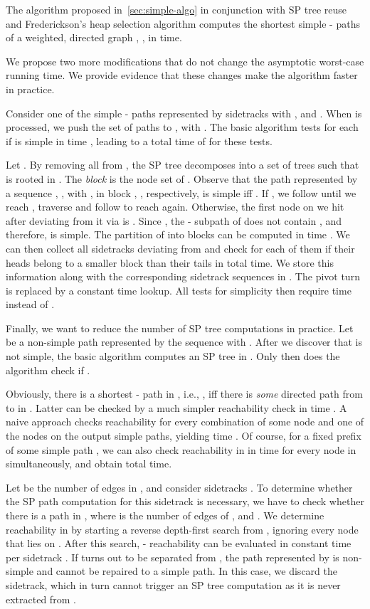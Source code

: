 \documentclass[runningheads,a4paper]{llncs}
\begin{document}
\begin{corollary}
    The algorithm proposed in~\autoref{sec:simple-algo} in conjunction with SP tree reuse and Frederickson's heap selection algorithm computes the  shortest simple - paths of a weighted, directed graph , , in  time.
\end{corollary}

We propose two more modifications that do not change the asymptotic worst-case running time.
We provide evidence that these changes make the algorithm faster in practice.

Consider one of the  simple - paths  represented by sidetracks  with ,  and .
When  is processed, we push the set  of paths to , with .
The basic algorithm tests for each  if  is simple in time , leading to a total time of  for these tests.

Let .
By removing all  from , the SP tree decomposes into a set of trees  such that  is rooted in .
The \emph{block } is the node set of .
Observe that the path  represented by a sequence , , with ,  in block , , respectively, is simple iff .
If , we follow  until we reach , traverse  and follow  to reach  again.
Otherwise, the first node on  we hit after deviating from it via  is .
Since , the - subpath of  does not contain , and therefore,  is simple.
The partition of  into blocks can be computed in time .
We can then collect all sidetracks deviating from  and check for each of them if their heads belong to a smaller block than their tails in  total time.
We store this information along with the corresponding sidetrack sequences in .
The pivot turn is replaced by a constant time lookup.
All tests for simplicity then require time  instead of .

Finally, we want to reduce the number of SP tree computations in practice.
Let  be a non-simple path represented by the sequence  with .
After we discover that  is not simple, the basic algorithm computes an SP tree in .
Only then does the algorithm check if .

Obviously, there is a shortest - path in , i.e., , iff there is \emph{some} directed path from  to  in .
Latter can be checked by a much simpler reachability check in time .
A naive approach checks reachability for every combination of some node  and one of the  nodes on the output simple paths, yielding time .
Of course, for a fixed prefix  of some simple path , we can also check reachability in  in  time for every node in  simultaneously, and obtain  total time.

Let  be the number of edges in , and consider sidetracks .
To determine whether the SP path computation for this sidetrack is necessary, we have to check whether there is a path in , where  is the number of edges of , and .
We determine reachability in  by starting a reverse depth-first search from , ignoring every node that lies on .
After this search, - reachability can be evaluated in constant time per sidetrack .
If  turns out to be separated from , the path represented by  is non-simple and cannot be repaired to a simple path.
In this case, we discard the sidetrack, which in turn cannot trigger an SP tree computation as it is never extracted from .
\end{document}
